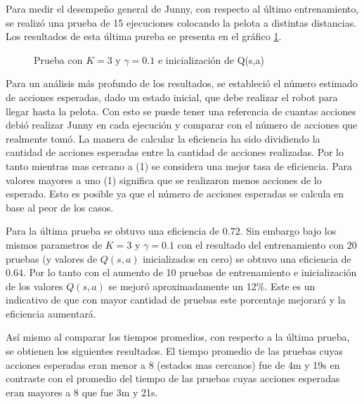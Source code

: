 Para medir el desempeño general de Junny, con respecto al último entrenamiento, se realizó una prueba de 15 ejecuciones colocando la pelota a distintas distancias. Los resultados de esta \'ultima pureba se presenta en el gr\'afico \ref{fig:mejor}. 

\begin{figure}[h]
\caption{Prueba con $K = 3$ y $ \gamma = 0.1 $ e inicializaci\'on de Q(s,a)}
\label{fig:mejor}
\end{figure} 

Para un análisis más profundo de los resultados, se estableci\'o el n\'umero estimado de acciones esperadas, dado un estado inicial, que debe realizar el robot para llegar hasta la pelota. Con esto se puede tener una referencia de cuantas acciones debió realizar Junny en cada ejecución y comparar con el número de acciones que realmente tomó. La manera de calcular la eficiencia ha sido dividiendo la cantidad de acciones esperadas entre la cantidad de acciones realizadas. Por lo tanto mientras mas cercano a (1) se considera una mejor tasa de eficiencia. Para valores mayores a uno (1) significa que se realizaron menos acciones de lo esperado. Esto es posible ya que el número de acciones esperadas se calcula en base al peor de los casos.  

Para la última prueba se obtuvo una eficiencia de $0.72$. Sin embargo bajo los mismos parametros de $K = 3$ y $ \gamma = 0.1 $ con el resultado del entrenamiento con 20 pruebas (y valores de $Q(s,a)$ inicializados en cero) se obtuvo una eficiencia de $0.64$. Por lo tanto con el aumento de 10 pruebas de entrenamiento e inicialización de los valores $Q(s,a)$ se mejoró aproximadamente un 12\%. Este es un indicativo de que con mayor cantidad de pruebas este porcentaje mejorar\'a y la eficiencia aumentará.

Así mismo al comparar los tiempos promedios, con respecto a la última prueba, se obtienen los siguientes resultados. El tiempo promedio de las pruebas cuyas acciones esperadas eran menor a 8 (estados mas cercanos) fue de 4m y 19s en contraste con el promedio del tiempo de las pruebas cuyas acciones esperadas eran mayores a 8 que fue 3m y 21s.

 

   

